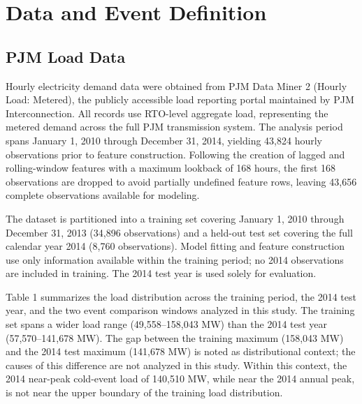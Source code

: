 \documentclass[12pt,a4paper]{article}
\begin{document}
\section{Data and Event Definition}
\subsection{PJM Load Data}
Hourly electricity demand data were obtained from PJM Data Miner 2 (Hourly Load: Metered), the publicly accessible load reporting portal maintained by PJM Interconnection. All records use RTO-level aggregate load, representing the metered demand across the full PJM transmission system. The analysis period spans January 1, 2010 through December 31, 2014, yielding 43,824 hourly observations prior to feature construction. Following the creation of lagged and rolling-window features with a maximum lookback of 168 hours, the first 168 observations are dropped to avoid partially undefined feature rows, leaving 43,656 complete observations available for modeling.


The dataset is partitioned into a training set covering January 1, 2010 through December 31, 2013 (34,896 observations) and a held-out test set covering the full calendar year 2014 (8,760 observations). Model fitting and feature construction use only information available within the training period; no 2014 observations are included in training. The 2014 test year is used solely for evaluation.


Table 1 summarizes the load distribution across the training period, the 2014 test year, and the two event comparison windows analyzed in this study. The training set spans a wider load range (49,558–158,043 MW) than the 2014 test year (57,570–141,678 MW). The gap between the training maximum (158,043 MW) and the 2014 test maximum (141,678 MW) is noted as distributional context; the causes of this difference are not analyzed in this study. Within this context, the 2014 near-peak cold-event load of 140,510 MW, while near the 2014 annual peak, is not near the upper boundary of the training load distribution.
\end{document}

